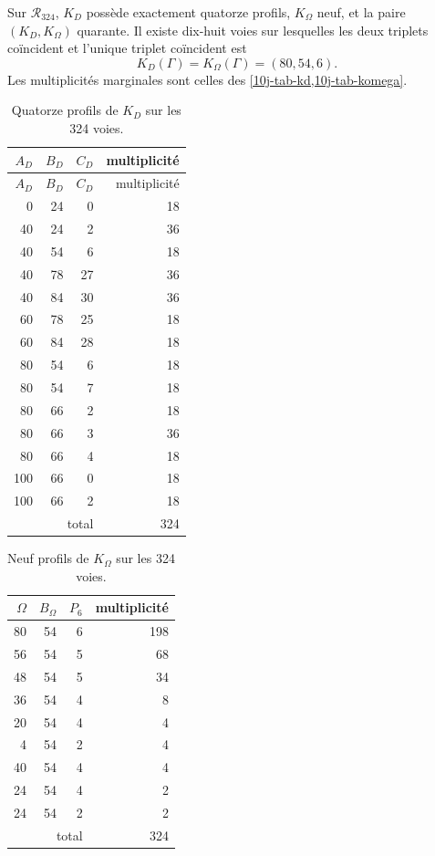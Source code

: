 \begin{theorem}
\label{10j-thm-censo-lectores}
Sur \(\mathcal R_{324}\), \(K_D\) possède exactement quatorze profils, \(K_\Omega\) neuf, et la paire \((K_D,K_\Omega)\) quarante. Il existe dix-huit voies sur lesquelles les deux triplets coïncident et l'unique triplet coïncident est
\begin{equation}
 K_D(\Gamma)=K_\Omega(\Gamma)=(80,54,6).
 \label{10j-eq-unica-coincidencia}
\end{equation}
Les multiplicités marginales sont celles des \cref{10j-tab-kd,10j-tab-komega}.
\end{theorem}

\begin{longtable}{@{}rrr r@{}}
\caption{Quatorze profils de \(K_D\) sur les 324 voies.}
\label{10j-tab-kd}\\
\toprule
\(A_D\)&\(B_D\)&\(C_D\)&multiplicité\\
\midrule
\endfirsthead
\toprule
\(A_D\)&\(B_D\)&\(C_D\)&multiplicité\\
\midrule
\endhead
0&24&0&18\\
40&24&2&36\\
40&54&6&18\\
40&78&27&36\\
40&84&30&36\\
60&78&25&18\\
60&84&28&18\\
80&54&6&18\\
80&54&7&18\\
80&66&2&18\\
80&66&3&36\\
80&66&4&18\\
100&66&0&18\\
100&66&2&18\\
\midrule
\multicolumn{3}{r}{total}&324\\
\bottomrule
\end{longtable}

\begin{table}[htbp]
\centering
\caption{Neuf profils de \(K_\Omega\) sur les 324 voies.}
\label{10j-tab-komega}
\begin{tabular}{@{}rrr r@{}}
\toprule
\(\Omega\)&\(B_\Omega\)&\(P_6\)&multiplicité\\
\midrule
80&54&6&198\\
56&54&5&68\\
48&54&5&34\\
36&54&4&8\\
20&54&4&4\\
4&54&2&4\\
40&54&4&4\\
24&54&4&2\\
24&54&2&2\\
\midrule
\multicolumn{3}{r}{total}&324\\
\bottomrule
\end{tabular}
\end{table}

